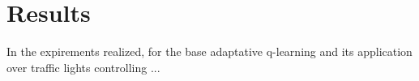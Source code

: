 
\section{Results}
\label{sec:results}


In the expirements realized, for the base adaptative q-learning and its application over traffic lights controlling ...



\endinput

